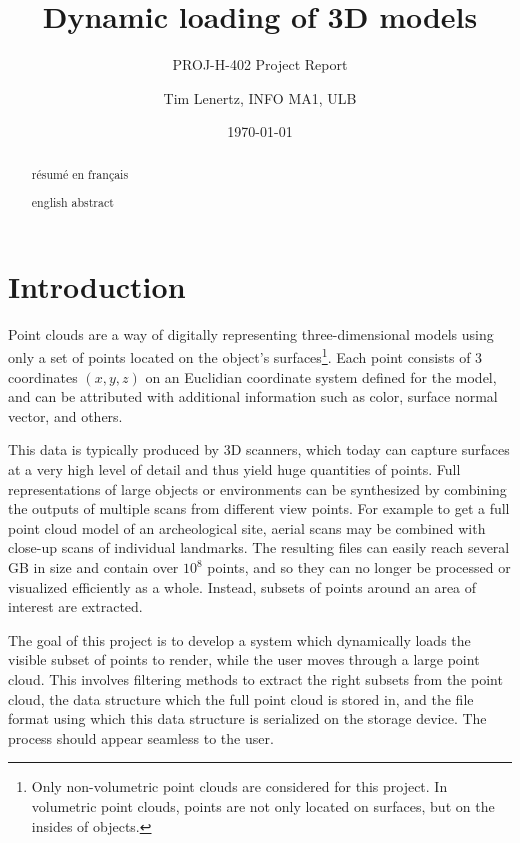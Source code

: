 \documentclass[a4paper,10pt,abstracton,notitlepage]{scrreprt}
\title{Dynamic loading of 3D models}
\subtitle{PROJ-H-402 Project Report}
\author{Tim Lenertz, INFO MA1, ULB}
\date{\today}
\begin{document}
\maketitle{}

\vspace{3cm}
\renewcommand{\abstractname}{Résumé}
\begin{abstract}
résumé en français
\end{abstract}

\vspace{2cm}
\renewcommand{\abstractname}{Abstract}
\begin{abstract}
english abstract
\end{abstract}

\tableofcontents{}

\chapter{Introduction}
Point clouds are a way of digitally representing three-dimensional models using only a set of points located on the object's surfaces\footnote{Only non-volumetric point clouds are considered for this project. In volumetric point clouds, points are not only located on surfaces, but on the insides of objects.}. Each point consists of 3 coordinates $(x, y, z)$ on an Euclidian coordinate system defined for the model, and can be attributed with additional information such as color, surface normal vector, and others.

This data is typically produced by 3D scanners, which today can capture surfaces at a very high level of detail and thus yield huge quantities of points. Full representations of large objects or environments can be synthesized by combining the outputs of multiple scans from different view points. For example to get a full point cloud model of an archeological site, aerial scans may be combined with close-up scans of individual landmarks. The resulting files can easily reach several GB in size and contain over $10^{8}$ points, and so they can no longer be processed or visualized efficiently as a whole. Instead, subsets of points around an area of interest are extracted.

The goal of this project is to develop a system which dynamically loads the visible subset of points to render, while the user moves through a large point cloud. This involves filtering methods to extract the right subsets from the point cloud, the data structure which the full point cloud is stored in, and the file format using which this data structure is serialized on the storage device. The process should appear seamless to the user.
\end{document}
